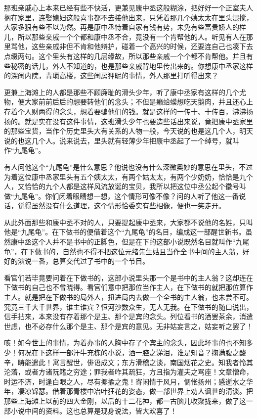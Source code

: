 \documentclass[12pt,UTF8]{ctexbook}
\begin{document}
{{{那班亲戚心上本来已经有些不快活，更兼见康中丞这般糊涂，把好好一个正室夫人搁在家里，连娶媳妇这般喜事都不去接他出来，只凭着那几个姨太太在里头混搅，大家多狠有些不以为然。再是康中丞恃着自家有钱有势，未免有些富贵娇人的样儿，所以那些亲戚一个个都和康中丞不合，竟没有一个肯帮他的人。听见有人在那里骂他，这些亲戚非但不肯和他辩护，碰着一个高兴的时候，还要连自己也凑下去点缀两句。这个里头有这样的几层缘故，所以那些亲戚一个个都不肯帮他。并且有些秘密的话儿，外人不知道的，也是那些亲戚背地里传出来的。你想康中丞家这样的深闺内院，青琐高楼，这些闺房狎昵的事情，外人那里打听得出来？

更兼上海滩上的人都是那些不顾廉耻的滑头少年，听了康中丞家有这样的几个尤物，便大家前前后后的想要转他们的念头；不但是癞蛤蟆想吃天鹅肉，并且还心上存着个人财两得的念头，想着要骗他们的钱。就是这样的一传十、十传百，沸沸扬扬的。就是实在没有这件事情，这班滑头少年也要造些话出来说，竟把康中丞家里的那些宝货，当作个历史里头大有关系的人物一般，今天说的也是这几个人，明天说的也这几个人。说来说去，里头就有轻薄少年把康中丞起了一个绰号，就叫作“九尾龟”。

有人问他这个“九尾龟”是什么意思？他说也没有什么深微奥妙的意思在里头，不过为着这位康中丞家里头有五个姨太太，有两个姑太太，有两个少奶奶，恰恰是九个人，又恰恰的九个人都是这样风流放诞的宝贝，我所以把这位中丞公起个徽号叫做“九尾龟”。你们闭着眼睛想一想，这个情形可像不像？问的人听了他这一番说话，觉得虽然没有什么道理，这个情形恰委实有些相像，便也一笑走开。

从此外面那些和康中丞不对的人，只要提起康中丞来，大家都不说他的名姓，只叫他是“九尾龟”。在下做书的便借着这个“九尾龟”的名目，编成这一部醒世新书。虽然康中丞这个人并不是书中的正脚色，但是在下的这部小说既然名目就叫作“九尾龟”，在下做书的，自然也不得不把这位元绪先生姑且当作全书中间的主人翁，好好的演说一番，总算交代过了书中的一个节目。

看官们若毕竟要问着在下做书的，这部小说里头那一个是书中的主人翁？这却连在下做书的自己也不曾晓得。看官们意中把那位当作主人，在下做书的就把那位算作主人。就是把在下做书的局外人，扭进局内去做一个全书的主人翁，也未尝不可。究竟三千大千世界，谁主谁宾？恒河沙数众生，无人无我。在下做书的随口说出，信手拈来，本来没有存着那个是主、那个是宾的念头。列位看书的酒罢茶余，消遣世虑，也不必存什么那个是主、那个是宾的意见。无非姑妄言之，姑妄听之罢了！

咳！如今世上的事情，为着办事的人胸中存了个宾主的念头，因此坏事的也不知多少！何况在下这样一部汗牛充栋的小说，洒一腔之涕泪，谁是知音？掬满腹之酸辛，畴能遣此！寓言醒世，俳语成文；东方滑稽之谈，南国烟花之史。知我者怜其沦落，或者方诸阮籍之穷途；罪我者咋其疏狂，方且指为灌夫之骂座！文章憎命，时运不济，时逢白眼之人，尽有揶揄之鬼！寄闲情于风月，惆怅扬州；感逝水之华年，凄凉锦瑟。借着那青楼中冶叶狂花的姿态，做一部世界上劝人讽世的清谈。把那些上海滩上以前的四大金刚，以后的十二花神，都一古脑儿收聚拢来，做了这一部小说中间的资料。这也总算是现身说法，皆大欢喜了！

}}}
\end{document}

